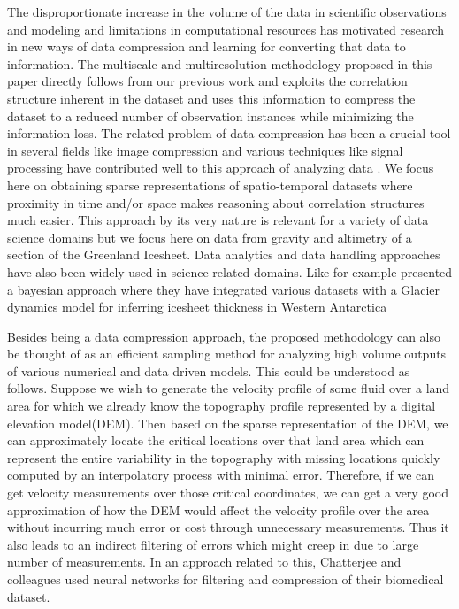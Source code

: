 \documentclass[procedia]{easychair}
\begin{document}
The disproportionate increase in the volume of the data in scientific observations and modeling and limitations in computational resources has motivated research in new ways of data compression and learning for converting that data to information. The multiscale and multiresolution methodology proposed in this paper directly follows from our previous work \cite{patra2016multilevel} and exploits the correlation structure inherent in the dataset and uses this information to compress the dataset to a reduced number of observation instances while minimizing the information loss. The related problem of data compression has been a crucial tool in several fields like image compression \cite{rufai2014lossy} and various techniques like signal processing have contributed well to this approach of analyzing data  \cite{sandryhaila2014big}. We focus here on obtaining sparse representations of spatio-temporal datasets where proximity in time and/or space makes reasoning about correlation structures much easier. This approach by its very nature is relevant for a variety of data science domains but we focus here on data from gravity and altimetry of a section of the Greenland Icesheet. Data analytics and data handling approaches have also been widely used in science related domains. Like for example \cite{guan2016inferring} presented a bayesian approach where they have integrated various datasets with a Glacier dynamics model for inferring icesheet thickness in Western Antarctica

Besides being a data compression approach, the proposed methodology can also be thought of as an efficient sampling method for analyzing high volume outputs of various numerical and data driven models. This could be understood as follows. Suppose we wish to generate the velocity profile of some fluid over a land area for which we already know the topography profile represented by a digital elevation model(DEM). Then based on the sparse representation of the DEM, we can approximately locate the critical locations over that land area which can represent the entire variability in the topography with missing locations quickly computed by an interpolatory process with minimal error. Therefore, if we can get velocity measurements over those critical coordinates, we can get a very good approximation of how the DEM would affect the velocity profile over the area without incurring much error or cost through unnecessary measurements. Thus it also leads to an indirect filtering of errors which might creep in due to large number of measurements. In an approach related to this, Chatterjee and colleagues \cite{chatterjee2013adaptive} used neural networks for filtering and compression of their biomedical dataset.
\end{document}
